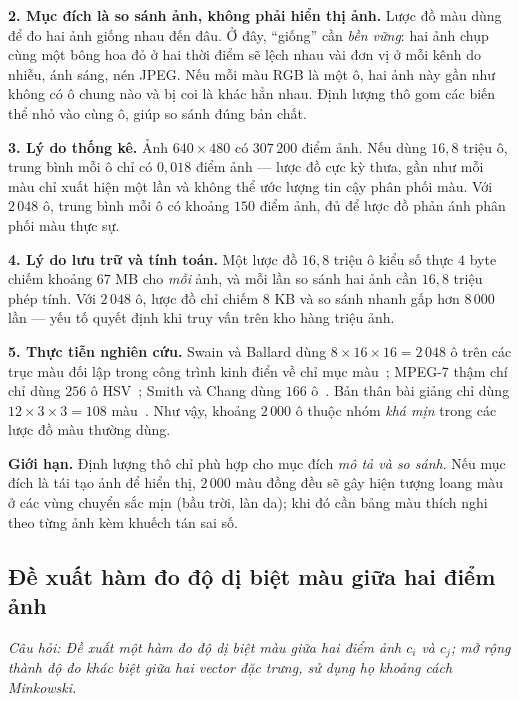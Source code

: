 \textbf{2. Mục đích là so sánh ảnh, không phải hiển thị ảnh.} Lược đồ màu dùng để đo hai ảnh giống nhau đến đâu. Ở đây, ``giống'' cần \emph{bền vững}: hai ảnh chụp cùng một bông hoa đỏ ở hai thời điểm sẽ lệch nhau vài đơn vị ở mỗi kênh do nhiễu, ánh sáng, nén JPEG. Nếu mỗi màu RGB là một ô, hai ảnh này gần như không có ô chung nào và bị coi là khác hẳn nhau. Định lượng thô gom các biến thể nhỏ vào cùng ô, giúp so sánh đúng bản chất.

\textbf{3. Lý do thống kê.} Ảnh $640 \times 480$ có $307\,200$ điểm ảnh. Nếu dùng $16{,}8$ triệu ô, trung bình mỗi ô chỉ có $0{,}018$ điểm ảnh — lược đồ cực kỳ thưa, gần như mỗi màu chỉ xuất hiện một lần và không thể ước lượng tin cậy phân phối màu. Với $2\,048$ ô, trung bình mỗi ô có khoảng $150$ điểm ảnh, đủ để lược đồ phản ánh phân phối màu thực sự.

\textbf{4. Lý do lưu trữ và tính toán.} Một lược đồ $16{,}8$ triệu ô kiểu số thực $4$ byte chiếm khoảng $67$ MB cho \emph{mỗi} ảnh, và mỗi lần so sánh hai ảnh cần $16{,}8$ triệu phép tính. Với $2\,048$ ô, lược đồ chỉ chiếm $8$ KB và so sánh nhanh gấp hơn $8\,000$ lần — yếu tố quyết định khi truy vấn trên kho hàng triệu ảnh.

\textbf{5. Thực tiễn nghiên cứu.} Swain và Ballard dùng $8 \times 16 \times 16 = 2\,048$ ô trên các trục màu đối lập trong công trình kinh điển về chỉ mục màu~\citep{swain1991color}; MPEG-7 thậm chí chỉ dùng $256$ ô HSV~\citep{manjunath2001color}; Smith và Chang dùng $166$ ô~\citep{smith1996visualseek}. Bản thân bài giảng chỉ dùng $12 \times 3 \times 3 = 108$ màu~\citep{xlav_lec2}. Như vậy, khoảng $2\,000$ ô thuộc nhóm \emph{khá mịn} trong các lược đồ màu thường dùng.

\textbf{Giới hạn.} Định lượng thô chỉ phù hợp cho mục đích \emph{mô tả và so sánh}. Nếu mục đích là tái tạo ảnh để hiển thị, $2\,000$ màu đồng đều sẽ gây hiện tượng loang màu ở các vùng chuyển sắc mịn (bầu trời, làn da); khi đó cần bảng màu thích nghi theo từng ảnh kèm khuếch tán sai số.

\subsection{Đề xuất hàm đo độ dị biệt màu giữa hai điểm ảnh}
\label{subsec:w4_dissim}

\textit{Câu hỏi: Đề xuất một hàm đo độ dị biệt màu giữa hai điểm ảnh $c_i$ và $c_j$; mở rộng thành độ đo khác biệt giữa hai vector đặc trưng, sử dụng họ khoảng cách Minkowski.}

